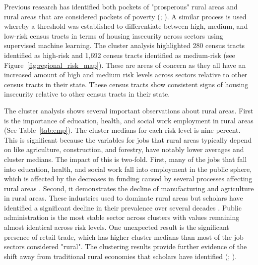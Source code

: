 Previous research has identified both pockets of "prosperous" rural areas and rural areas that are considered pockets of poverty (\citealp{isserman_why_2009}; \citealp{miller_persistent_2003}). A similar process is used whereby a threshold was established to differentiate between high, medium, and low-risk census tracts in terms of housing insecurity across sectors using supervised machine learning. The cluster analysis highlighted 280 census tracts identified as high-risk and 1,692 census tracts identified as medium-risk (see Figure~\ref{fig:regional_risk_map}). These are areas of concern as they all have an increased amount of high and medium risk levels across sectors relative to other census tracts in their state. These census tracts show consistent signs of housing insecurity relative to other census tracts in their state. 

 The cluster analysis shows several important observations about rural areas. First is the importance of education, health, and social work employment in rural areas (See Table~\ref{tab:emp}). The cluster medians for each risk level is nine percent. This is significant because the variables for jobs that rural areas typically depend on like agriculture, construction, and forestry, have notably lower averages and cluster medians. The impact of this is two-fold. First, many of the jobs that fall into education, health, and social work fall into employment in the public sphere, which is affected by the decreases in funding caused by several processes affecting rural areas \citep{blank_poverty_2005}. Second, it demonstrates the decline of manufacturing and agriculture in rural areas. These industries used to dominate rural areas but scholars have identified a significant decline in their prevalence over several decades \citep{robertson_rural_2007}. Public administration is the most stable sector across clusters with values remaining almost identical across risk levels. One unexpected result is the significant presence of retail trade, which has higher cluster medians than most of the job sectors considered "rural". The clustering results provide further evidence of the shift away from traditional rural economies that scholars have identified (\citealp{pendall_future_2016}; \citealp{blank_poverty_2005}).
 
